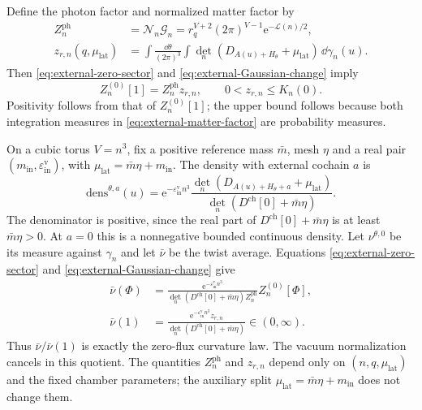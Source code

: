 Define the photon factor and normalized matter factor by
\begin{align}
 Z_n^{\mathrm{ph}}&=\mathcal N_n\mathcal G_n
       =r_q^{V+2}(2\pi)^{V-1}
                            \mathrm e^{-\mathcal L(n)/2},
                                  \label{eq:external-photon-factor}\\
 z_{r,n}(q,\mu_{\mathrm{lat}})
   &=\int\frac{\dd\theta}{(2\pi)^3}
       \int\det_n(D_{A(u)+H_\theta}+\mu_{\mathrm{lat}})
                                             \,\dd\gamma_n(u).
                                  \label{eq:external-matter-factor}
\end{align}
Then \eqref{eq:external-zero-sector} and
\eqref{eq:external-Gaussian-change} imply
\begin{equation}\label{eq:external-zero-factorization}
 Z_n^{(0)}[1]=Z_n^{\mathrm{ph}}z_{r,n},\qquad
                         0<z_{r,n}\le K_n(0).
\end{equation}
Positivity follows from that of $Z_n^{(0)}[1]$;
the upper bound follows because both integration
measures in \eqref{eq:external-matter-factor} are
probability measures.

On a cubic torus $V=n^3$, fix a positive reference mass
$\bar m$, mesh $\eta$ and a real pair
$(m_{\mathrm{in}},\varepsilon_{\mathrm{in}}^{\mathrm v})$,
with $\mu_{\mathrm{lat}}=\bar m\eta+m_{\mathrm{in}}$.
The density with external cochain $a$ is
\begin{equation}\label{eq:external-matter-density}
 \mathrm{dens}^{\theta,a}(u)=
 \mathrm e^{-\varepsilon_{\mathrm{in}}^{\mathrm v}n^3}
 \frac{\det_n(D_{A(u)+H_\theta+a}+\mu_{\mathrm{lat}})}
                       {\det_n(D^{\mathrm{ch}}[0]+\bar m\eta)}.
\end{equation}
The denominator is positive, since the real part
of $D^{\mathrm{ch}}[0]+\bar m\eta$ is at least $\bar m\eta>0$.
At $a=0$ this is a nonnegative bounded continuous
density. Let $\nu^{\theta,0}$ be its measure against
$\gamma_n$ and let $\bar\nu$ be the twist average.
Equations \eqref{eq:external-zero-sector} and
\eqref{eq:external-Gaussian-change} give
\begin{align}
 \bar\nu(\Phi)
   &=\frac{\mathrm e^{-\varepsilon_{\mathrm{in}}^{\mathrm v}n^3}}
        {\det_n(D^{\mathrm{ch}}[0]+\bar m\eta)Z_n^{\mathrm{ph}}}
                                      Z_n^{(0)}[\Phi],
                                  \label{eq:external-density-zero-sector}\\
 \bar\nu(1)
   &=\frac{\mathrm e^{-\varepsilon_{\mathrm{in}}^{\mathrm v}n^3}
                                   z_{r,n}}
                       {\det_n(D^{\mathrm{ch}}[0]+\bar m\eta)}
                                  \in(0,\infty).
                                  \label{eq:external-density-normalization}
\end{align}
Thus $\bar\nu/\bar\nu(1)$ is exactly the zero-flux
curvature law. The vacuum normalization cancels in
this quotient. The quantities $Z_n^{\mathrm{ph}}$
and $z_{r,n}$ depend only on $(n,q,\mu_{\mathrm{lat}})$
and the fixed chamber parameters; the auxiliary
split $\mu_{\mathrm{lat}}=\bar m\eta+m_{\mathrm{in}}$
does not change them.

